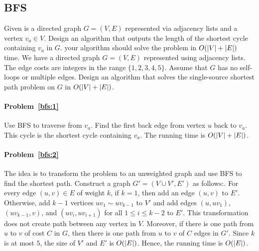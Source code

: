 \subsection{BFS}

\begin{Exercise}
\Question Given is a directed graph $G = (V, E)$ represented via adjacency lists and a vertex $v_a \in V$. Design an algorithm that outputs the length of the shortest cycle containing $v_a$ in $G$. your algorithm should solve the problem in $O(\lvert V\rvert + \lvert E\rvert)$ time. \label{bfs:1}
\Question We have a directed graph $G = (V, E)$ represented using adjacency lists. The edge costs are integers in the range $\{1, 2, 3, 4, 5\}$. Assume that $G$ has no self-loops or multiple edges. Design an algorithm that solves the single-source shortest path problem on $G$ in $O(\lvert V\rvert+\lvert E\rvert)$. \label{bfs:2}
\end{Exercise}
\begin{Answer}
\paragraph{Problem~\ref{bfs:1}}
Use BFS to traverse from $v_a$. Find the first back edge from vertex $u$ back to $v_a$. This cycle is the shortest cycle containing $v_a$. The running time is $O(\lvert V\rvert + \lvert E\rvert)$.

\paragraph{Problem~\ref{bfs:2}}
The idea is to transform the problem to an unweighted graph and use BFS to find the shortest path. Construct a graph $G' = (V \cup V', E')$ as follows:. For every edge $(u, v) \in E$ of weight $k$, if $k = 1$, then add an edge $(u, v)$ to $E'$. Otherwise, add $k-1$ vertices $uv_1 \sim uv_{k-1}$ to $V'$ and add edges $(u, uv_1)$, $(uv_{k-1}, v)$, and $(uv_i, uv_{i+1})$ for all $1 \leq i \leq k-2$ to $E'$. This transformation does not create path between any vertex in $V$. Moreover, if there is one path from $u$ to $v$ of cost $C$ in $G$, then there is one path from $u$ to $v$ of $C$ edges in $G'$. Since $k$ is at most $5$, the size of $V'$ and $E'$ is $O(\lvert E\rvert)$. Hence, the running time is $O(\lvert E\rvert)$.
\end{Answer}

